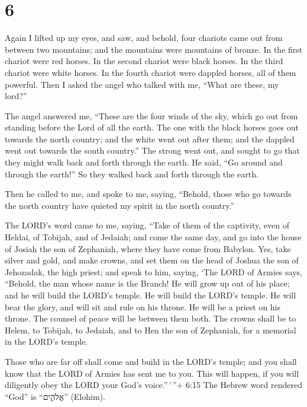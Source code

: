 \hypertarget{section-5}{%
\section{6}\label{section-5}}

 Again I lifted up my eyes, and saw, and behold, four
chariots came out from between two mountains; and the mountains were
mountains of bronze.  In the first chariot were red horses.
In the second chariot were black horses.  In the third
chariot were white horses. In the fourth chariot were dappled horses,
all of them powerful.  Then I asked the angel who talked
with me, ``What are these, my lord?''

 The angel answered me, ``These are the four winds of the
sky, which go out from standing before the Lord of all the earth.
 The one with the black horses goes out towards the north
country; and the white went out after them; and the dappled went out
towards the south country.''  The strong went out, and
sought to go that they might walk back and forth through the earth. He
said, ``Go around and through the earth!'' So they walked back and forth
through the earth.

 Then he called to me, and spoke to me, saying, ``Behold,
those who go towards the north country have quieted my spirit in the
north country.''

 The LORD's word came to me, saying,  ``Take of
them of the captivity, even of Heldai, of Tobijah, and of Jedaiah; and
come the same day, and go into the house of Josiah the son of Zephaniah,
where they have come from Babylon.  Yes, take silver and
gold, and make crowns, and set them on the head of Joshua the son of
Jehozadak, the high priest;  and speak to him, saying, `The
LORD of Armies says, ``Behold, the man whose name is the Branch! He will
grow up out of his place; and he will build the LORD's temple.
 He will build the LORD's temple. He will bear the glory,
and will sit and rule on his throne. He will be a priest on his throne.
The counsel of peace will be between them both.  The crowns
shall be to Helem, to Tobijah, to Jedaiah, and to Hen the son of
Zephaniah, for a memorial in the LORD's temple.

 Those who are far off shall come and build in the LORD's
temple; and you shall know that the LORD of Armies has sent me to you.
This will happen, if you will diligently obey the LORD your God's
voice.''\,'\,''+ 6:15 The Hebrew word rendered ``God'' is ``אֱלֹהִ֑ים''
(Elohim).

